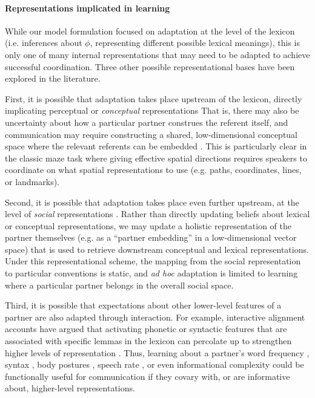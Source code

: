 \paragraph{Representations implicated in learning} 

While our model formulation focused on adaptation at the level of the lexicon (i.e. inferences about $\phi$, representing different possible lexical meanings), this is only one of many internal representations that may need to be adapted to achieve successful coordination. 
Three other possible representational bases have been explored in the literature. 

First, it is possible that adaptation takes place upstream of the lexicon, directly implicating perceptual or \emph{conceptual} representations \cite{GarrodAnderson87_SayingWhatYouMean,HealeySwobodaUmataKing07_GraphicalLanguageGames}
That is, there may also be uncertainty about how a particular partner construes the referent itself, and communication may require constructing a shared, low-dimensional conceptual space where the relevant referents can be embedded \cite{stolk2016conceptual}.
This is particularly clear in the classic maze task \cite{GarrodAnderson87_SayingWhatYouMean} where giving effective spatial directions requires speakers to coordinate on what spatial representations to use (e.g. paths, coordinates, lines, or landmarks). 

Second, it is possible that adaptation takes place even further upstream, at the level of \emph{social} representations \cite{jaech2018low}.
Rather than directly updating beliefs about lexical or conceptual representations, we may update a holistic representation of the partner themselves (e.g. as a ``partner embedding'' in a low-dimensional vector space) that is used to retrieve downstream conceptual and lexical representations. 
Under this representational scheme, the mapping from the social representation to particular conventions is static, and \emph{ad hoc} adaptation is limited to learning where a particular partner belongs in the overall social space.

Third, it is possible that expectations about other lower-level features of a partner are also adapted through interaction.
For example, interactive alignment accounts \cite{pickering2004toward} have argued that activating phonetic or syntactic features that are associated with specific lemmas in the lexicon can percolate up to strengthen higher levels of representation \cite{roelofs1992spreading,pickering1998representation}.
Thus, learning about a partner's word frequency \cite{louwerse2012behavior}, syntax \cite{gruberg2019syntactic,levelt1982surface}, body postures \cite{lakin2003using}, speech rate \cite{giles1991contexts}, or even informational complexity \cite{abney2014complexity} could be functionally useful for communication if they covary with, or are informative about, higher-level representations. 

